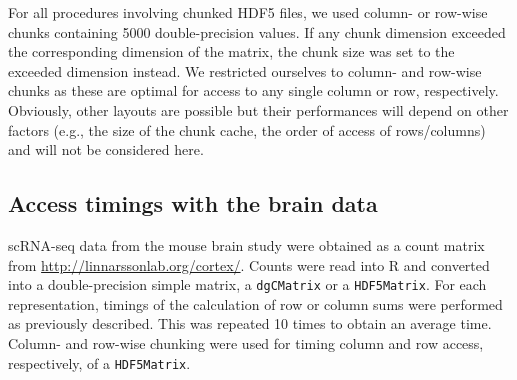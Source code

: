 \documentclass[10pt,letterpaper]{article}
\newcommand{\code}[1]{\texttt{#1}}
\begin{document}
For all procedures involving chunked HDF5 files, we used column- or row-wise chunks containing 5000 double-precision values.
If any chunk dimension exceeded the corresponding dimension of the matrix, the chunk size was set to the exceeded dimension instead.
We restricted ourselves to column- and row-wise chunks as these are optimal for access to any single column or row, respectively.
Obviously, other layouts are possible but their performances will depend on other factors (e.g., the size of the chunk cache, the order of access of rows/columns) and will not be considered here.

\subsection*{Access timings with the brain data}
scRNA-seq data from the mouse brain study \cite{zeisel2015brain} were obtained as a count matrix from \url{http://linnarssonlab.org/cortex/}.
Counts were read into R and converted into a double-precision simple matrix, a \code{dgCMatrix} or a \code{HDF5Matrix}.
For each representation, timings of the calculation of row or column sums were performed as previously described.
This was repeated 10 times to obtain an average time.
Column- and row-wise chunking were used for timing column and row access, respectively, of a \code{HDF5Matrix}.

{\small
    
    
}
\end{document}
